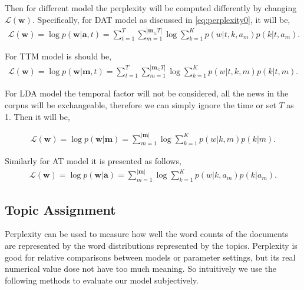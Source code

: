 Then for different model the perplexity will be computed differently by changing $\mathcal L (\boldsymbol w)$. Specifically, for DAT model as discussed in \eqref{eq:perplexity0}, it will be, 
\begin{equation}\label{p1}
\begin{split}
\mathcal L (\boldsymbol w)
    = \log p(\boldsymbol w | \boldsymbol a, t)
    = \sum_{t=1}^{T}\sum_{m=1}^{|\mathbf{m}_\le T|}\log \sum_{k=1}^K p(w | t,k,a_m)p(k | t,a_m).
\end{split}
\end{equation}

For TTM model is should be,
\begin{equation}\label{p2}
\begin{split}
\mathcal L (\boldsymbol w)
    = \log p(\boldsymbol w | \boldsymbol m, t)
    = \sum_{t=1}^{T}\sum_{m=1}^{|\mathbf{m}_\le T|}\log \sum_{k=1}^K p(w | t,k,m)p(k | t,m).
\end{split}
\end{equation}

For LDA model the temporal factor will not be considered, all the news in the corpus will be exchangeable, therefore we can simply ignore the time or set $T$ as 1. Then it will be, 

\begin{equation}\label{p2}
\begin{split}
\mathcal L (\boldsymbol w)
    = \log p(\boldsymbol w | \boldsymbol m)
    = \sum_{m=1}^{|\mathbf{m}|}\log \sum_{k=1}^K p(w | k,m)p(k | m).
\end{split}
\end{equation}

Similarly for AT model it is presented as follows,
\begin{equation}\label{p1}
\begin{split}
\mathcal L (\boldsymbol w)
    = \log p(\boldsymbol w | \boldsymbol a)
    = \sum_{m=1}^{|\mathbf{m}|}\log \sum_{k=1}^K p(w | k,a_m)p(k | a_m).
\end{split}
\end{equation}







\subsection{Topic Assignment}\label{sec:topicassignment}

Perplexity can be used to measure how well the word counts of the documents are represented by the word distributions represented by the topics. Perplexity is good for relative comparisons between models or parameter settings, but its real numerical value dose not have too much meaning. So intuitively we use the following methods to evaluate our model subjectively.

